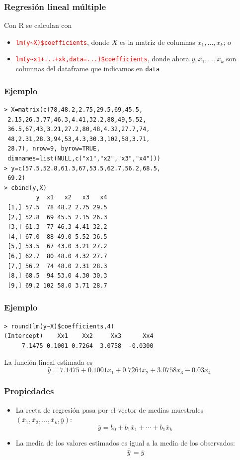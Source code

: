 \documentclass[12pt,t]{beamer}
\newcommand{\red}[1]{\textcolor{red}{#1}}
\theoremstyle{plain}
\theoremstyle{definition}
\begin{document}
\begin{frame}
\frametitle{Regresión lineal múltiple}



Con R se calculan con\medskip

\begin{itemize}
\item \red{\tt lm(y\~{}X)\$coefficients}, donde $X$ es la matriz de columnas $x_1,\ldots,x_k$; o\medskip

\item \red{\tt lm(y\~{}x1+...+xk,data=...)\$coefficients}, donde ahora $y,x_1,\ldots,x_k$ son columnas del dataframe que indicamos en \texttt{data}
\end{itemize}



\end{frame}


\begin{frame}[fragile]
\frametitle{Ejemplo}
\begin{lstlisting}
> X=matrix(c(78,48.2,2.75,29.5,69,45.5,
 2.15,26.3,77,46.3,4.41,32.2,88,49,5.52,
 36.5,67,43,3.21,27.2,80,48,4.32,27.7,74,
 48,2.31,28.3,94,53,4.3,30.3,102,58,3.71,
 28.7), nrow=9, byrow=TRUE, 
 dimnames=list(NULL,c("x1","x2","x3","x4")))
> y=c(57.5,52.8,61.3,67,53.5,62.7,56.2,68.5,
 69.2)
> cbind(y,X)
         y  x1   x2   x3   x4
 [1,] 57.5  78 48.2 2.75 29.5
 [2,] 52.8  69 45.5 2.15 26.3
 [3,] 61.3  77 46.3 4.41 32.2
 [4,] 67.0  88 49.0 5.52 36.5
 [5,] 53.5  67 43.0 3.21 27.2
 [6,] 62.7  80 48.0 4.32 27.7
 [7,] 56.2  74 48.0 2.31 28.3
 [8,] 68.5  94 53.0 4.30 30.3
 [9,] 69.2 102 58.0 3.71 28.7
\end{lstlisting}
\end{frame}


\begin{frame}[fragile]
\frametitle{Ejemplo}

\begin{lstlisting}
> round(lm(y~X)$coefficients,4)
(Intercept)    Xx1    Xx2     Xx3      Xx4 
     7.1475 0.1001 0.7264  3.0758  -0.0300 
\end{lstlisting}\medskip

La función lineal estimada es
$$
\widehat{y}=7.1475+ 0.1001x_1+ 0.7264x_2+  3.0758x_3  -0.03x_4
$$
\end{frame}

\begin{frame}
\frametitle{Propiedades}

\begin{itemize}
\item La recta de regresión pasa por el vector de medias muestrales
$(\overline{x}_1,\overline{x}_2,\ldots,\overline{x}_k,\overline{y})$:
$$
\overline{y}=b_0+b_1 \overline{x}_1+\cdots+b_1 \overline{x}_k
$$

\item La media de los valores estimados es igual a la media de los
observados:
$$
\overline{\,\widehat{y}\,}=\overline{y}
$$
\end{itemize}

\end{frame}
\end{document}
